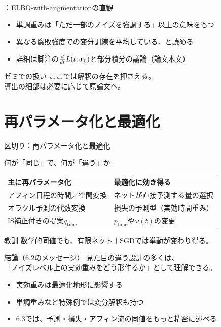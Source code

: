 \assuppl
\begin{frame}{\supplmark：ELBO-with-augmentationの直観}
    \begin{itemize}
        \item 単調重みは「ただ一部のノイズを強調する」以上の意味をもつ
        \item 異なる腐敗強度での変分訓練を平均している、と読める
        \item 詳細は脚注の$\frac{d}{dt}L(t;\bm{x}_0)$と部分積分の議論（論文本文）
    \end{itemize}
    \begin{block}{ゼミでの扱い}
        ここでは解釈の存在を押さえる。\\
        導出の細部は必要に応じて原論文へ。
    \end{block}
\end{frame}
\section{再パラメータ化と最適化}
\asmain
\begin{frame}{区切り：再パラメータ化と最適化}
    \tableofcontents[currentsection]
\end{frame}
\asmain
\begin{frame}{何が「同じ」で、何が「違う」か}
    \renewcommand{\arraystretch}{1.2}
    \begin{tabular}{p{}p{}}
        \hline
        主に再パラメータ化 & 最適化に効き得る \\
        \hline
        アフィン日程の時間／空間変換
            & ネットが直接予測する量の選択 \\
        オラクル予測の代数変換
            & 損失の予測型（実効時間重み） \\
        IS補正付きの提案$q_{\mathrm{time}}$
            & $p_{\mathrm{time}}$や$\omega(t)$の変更 \\
        \hline
    \end{tabular}
    \vspace{0.5em}
    \begin{alertblock}{教訓}
        数学的同値でも、有限ネット＋SGDでは挙動が変わり得る。
    \end{alertblock}
\end{frame}
\asmain
\begin{frame}{結論（6.2のメッセージ）}
    見た目の違う設計の多くは、\\
    「ノイズレベル上の実効重みをどう形作るか」として理解できる。
    \begin{itemize}
        \item 実効重みは最適化地形に影響する
        \item 単調重みなど特殊例では変分解釈も持つ
        \item 6.3では、予測・損失・アフィン流の同値をもっと精密に述べる
    \end{itemize}
\end{frame}
